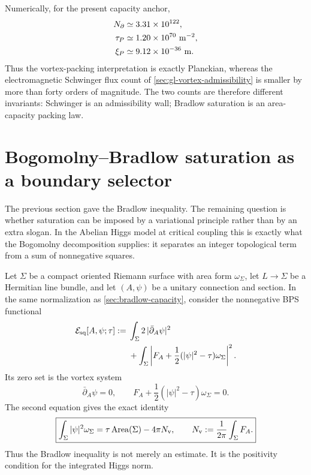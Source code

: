 \documentclass[aps,prd,reprint,nofootinbib,superscriptaddress,floatfix]{revtex4-2}
\numberwithin{equation}{section}
\theoremstyle{definition}
\theoremstyle{plain}
\newcommand{\Ncap}{N_{\partial}}
\begin{document}
Numerically, for the present capacity anchor,
\begin{align}
\Ncap&\simeq3.31\times10^{122},\\
\tau_P&\simeq1.20\times10^{70}\ {\rm m}^{-2},\\
\xi_P&\simeq9.12\times10^{-36}\ {\rm m}.
\end{align}
Thus the vortex-packing interpretation is exactly Planckian, whereas the
electromagnetic Schwinger flux count of \cref{sec:gl-vortex-admissibility}
is smaller by more than forty orders of magnitude.  The two counts are
therefore different invariants: Schwinger is an admissibility wall;
Bradlow saturation is an area-capacity packing law.



\section{Bogomolny--Bradlow saturation as a boundary selector}
\label{sec:bogomolny-bradlow-selector}

The previous section gave the Bradlow inequality.  The remaining question is
whether saturation can be imposed by a variational principle rather than by an
extra slogan.  In the Abelian Higgs model at critical coupling this is exactly
what the Bogomolny decomposition supplies: it separates an integer topological
term from a sum of nonnegative squares.

Let \(\Sigma\) be a compact oriented Riemann surface with area form
\(\omega_\Sigma\), let \(L\to\Sigma\) be a Hermitian line bundle, and let
\((A,\psi)\) be a unitary connection and section.  In the same normalization as
\cref{sec:bradlow-capacity}, consider the nonnegative BPS functional
\begin{align}
\mathcal E_{\rm sq}[A,\psi;\tau]
:={}&
\int_\Sigma 2\,|\bar\partial_A\psi|^2 \nonumber\\
&+
\int_\Sigma
\left|
F_A+\frac12(|\psi|^2-\tau)\omega_\Sigma
\right|^2 .
\end{align}
Its zero set is the vortex system
\begin{equation}
\bar\partial_A\psi=0,
\qquad
F_A+\frac12(|\psi|^2-\tau)\omega_\Sigma=0.
\end{equation}
The second equation gives the exact identity
\begin{equation}
\boxed{
\int_\Sigma |\psi|^2\omega_\Sigma
=
\tau\,{\rm Area}(\Sigma)-4\pi N_{\rm v},
\qquad
N_{\rm v}:=\frac1{2\pi}\int_\Sigma F_A .
}
\label{eq:bradlow-identity}
\end{equation}
Thus the Bradlow inequality is not merely an estimate.  It is the positivity
condition for the integrated Higgs norm.
\end{document}
